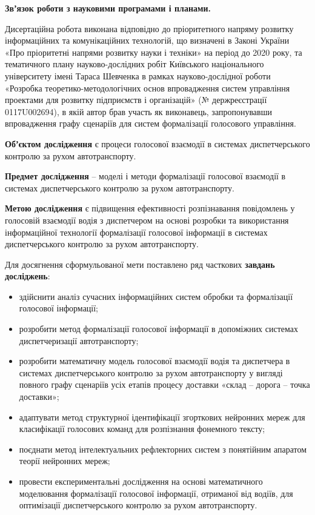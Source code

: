 \textbf{Звʼязок роботи з науковими програмами і планами.}

Дисертаційна робота виконана відповідно до пріоритетного напряму розвитку інформаційних та комунікаційних технологій, що визначені в Законі України «Про пріоритетні напрями розвитку науки і техніки» на період до 2020 року, та тематичного плану науково-дослідних робіт Київського національного університету імені Тараса Шевченка в рамках науково-дослідної роботи «Розробка теоретико-методологічних основ впровадження систем управління проектами для розвитку підприємств і організацій» (№ держреєстрації 0117U002694), в якій автор брав участь як виконавець, запропонувавши впровадження графу сценаріїв для систем формалізації голосового управління.

\textbf{Обʼєктом дослідження} є процеси голосової взаємодії в системах диспетчерського контролю за рухом автотранспорту.

\textbf{Предмет дослідження} – моделі і методи формалізації голосової взаємодії в системах диспетчерського контролю за рухом автотранспорту.

\textbf{Метою дослідження} є підвищення ефективності розпізнавання повідомлень у голосовій взаємодії водія з диспетчером на основі розробки та використання інформаційної технології формалізації голосової інформації в системах диспетчерського контролю за рухом автотранспорту.

Для досягнення сформульованої мети поставлено ряд часткових \textbf{завдань досліджень}:

\begin{itemize}
	\item здійснити аналіз сучасних інформаційних систем обробки та формалізації голосової інформації;
	\item розробити метод формалізації голосової інформації в допоміжних системах диспетчеризації автотранспорту;
	\item розробити математичну модель голосової взаємодії водія та диспетчера в системах диспетчерського контролю за рухом автотранспорту у вигляді повного графу сценаріїв усіх етапів процесу доставки «склад – дорога – точка доставки»;
	\item адаптувати метод структурної ідентифікації згорткових нейронних мереж для класифікації голосових команд для розпізнання фонемного тексту;
	\item поєднати метод інтелектуальних рефлекторних систем з понятійним апаратом теорії нейронних мереж;
	\item провести експериментальні дослідження на основі математичного моделювання формалізації голосової інформації, отриманої від водіїв, для оптимізації диспетчерського контролю за рухом автотранспорту.
\end{itemize}

